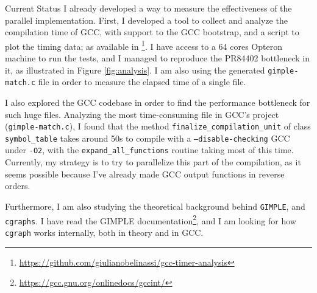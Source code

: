 \documentclass[12pt]{article}
\begin{document}
\begin{subsection}{Current Status}
I already developed a way to measure the effectiveness of the parallel implementation.
First, I developed a tool to collect and analyze the compilation time of GCC, with
support to the GCC bootstrap, and a script to plot the timing data; as available
in \footnote{\url{https://github.com/giulianobelinassi/gcc-timer-analysis}}.
I have access to a 64 cores Opteron machine to run the tests, and I managed to
    reproduce the PR84402 bottleneck in it, as illustrated in Figure \ref{fig:analysis}.
I am also using the generated \texttt{gimple-match.c} file in order to measure the elapsed
time of a single file.


I also explored the GCC codebase in order to find the performance bottleneck for
such huge files. Analyzing the most time-consuming file in GCC's project
(\texttt{gimple-match.c}), I found that the method
\texttt{finalize\_compilation\_unit} of
class \texttt{symbol\_table} takes around 50s to compile with a
\texttt{--disable-checking} GCC under \texttt{-O2}, with the \texttt{expand\_all\_functions}
routine taking most of this time. Currently, my strategy is to try to parallelize
this part of the compilation, as it seems possible because I've already made GCC output
functions in reverse orders.

Furthermore, I am also studying the theoretical background behind \texttt{GIMPLE},
and \texttt{cgraphs}. I have read the GIMPLE
documentation\footnote{\url{https://gcc.gnu.org/onlinedocs/gccint/}}, and
I am looking for how \texttt{cgraph} works internally, both in theory and in
GCC.

\end{subsection}
\end{document}
